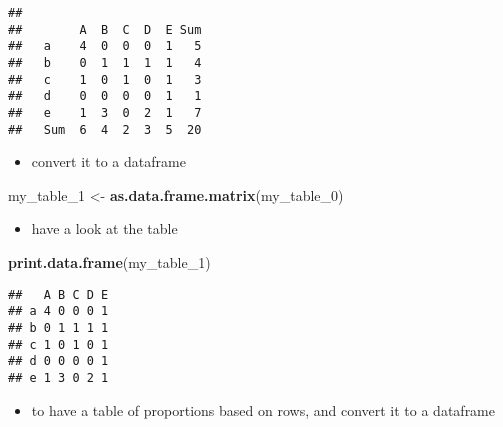\documentclass[
]{article}
\newenvironment{Shaded}{\begin{snugshade}}{\end{snugshade}}
\newcommand{\DataTypeTok}[1]{\textcolor[rgb]{0.13,0.29,0.53}{#1}}
\newcommand{\DecValTok}[1]{\textcolor[rgb]{0.00,0.00,0.81}{#1}}
\newcommand{\KeywordTok}[1]{\textcolor[rgb]{0.13,0.29,0.53}{\textbf{#1}}}
\newcommand{\NormalTok}[1]{#1}
\newcommand{\OperatorTok}[1]{\textcolor[rgb]{0.81,0.36,0.00}{\textbf{#1}}}
\newcommand{\StringTok}[1]{\textcolor[rgb]{0.31,0.60,0.02}{#1}}
\providecommand{\tightlist}{%
  \setlength{\itemsep}{0pt}\setlength{\parskip}{0pt}}
\begin{document}
\begin{verbatim}
##      
##        A  B  C  D  E Sum
##   a    4  0  0  0  1   5
##   b    0  1  1  1  1   4
##   c    1  0  1  0  1   3
##   d    0  0  0  0  1   1
##   e    1  3  0  2  1   7
##   Sum  6  4  2  3  5  20
\end{verbatim}

\begin{itemize}
\tightlist
\item
  convert it to a dataframe
\end{itemize}

\begin{Shaded}
\begin{Highlighting}[]
\NormalTok{my_table_}\DecValTok{1}\NormalTok{ <-}\StringTok{ }\KeywordTok{as.data.frame.matrix}\NormalTok{(my_table_}\DecValTok{0}\NormalTok{)}
\end{Highlighting}
\end{Shaded}

\begin{itemize}
\tightlist
\item
  have a look at the table
\end{itemize}

\begin{Shaded}
\begin{Highlighting}[]
\KeywordTok{print.data.frame}\NormalTok{(my_table_}\DecValTok{1}\NormalTok{)}
\end{Highlighting}
\end{Shaded}

\begin{verbatim}
##   A B C D E
## a 4 0 0 0 1
## b 0 1 1 1 1
## c 1 0 1 0 1
## d 0 0 0 0 1
## e 1 3 0 2 1
\end{verbatim}

\begin{itemize}
\tightlist
\item
  to have a table of proportions based on rows, and convert it to a
  dataframe
\end{itemize}

\begin{Shaded}
\end{Shaded}
\end{document}
